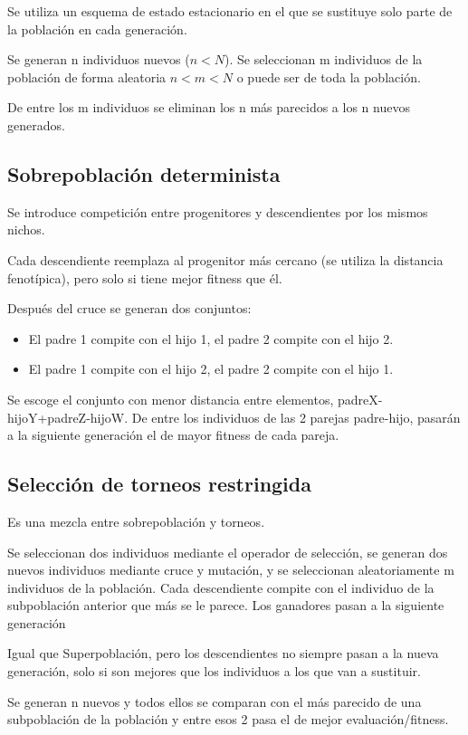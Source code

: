 \documentclass[12pt, twoside, openright]{report} %
\begin{document}
Se utiliza un esquema de estado estacionario en el que se sustituye solo parte de la población en cada generación.

Se generan n individuos nuevos ($n < N$). Se seleccionan m individuos de la población de forma aleatoria $n < m < N$ o puede ser de toda la población.

De entre los m individuos se eliminan los n más parecidos a los n nuevos generados.

\subsection{Sobrepoblación determinista}
Se introduce competición entre progenitores y descendientes por los mismos nichos.

Cada descendiente reemplaza al progenitor más cercano (se utiliza la distancia fenotípica), pero solo si tiene mejor fitness que él.

Después del cruce se generan dos conjuntos:
\begin{itemize}
	\item El padre 1 compite con el hijo 1, el padre 2 compite con el hijo 2.
	\item El padre 1 compite con el hijo 2, el padre 2 compite con el hijo	1.
\end{itemize}

Se escoge el conjunto con menor distancia entre elementos, padreX-hijoY+padreZ-hijoW. De entre los individuos de las 2 parejas padre-hijo, pasarán a la siguiente generación el de mayor fitness de cada pareja.

\subsection{Selección de torneos restringida}
Es una mezcla entre sobrepoblación y torneos.

Se seleccionan dos individuos mediante el operador de selección, se generan dos nuevos individuos mediante cruce y mutación, y se seleccionan aleatoriamente m individuos de la población. Cada descendiente compite con el individuo de la subpoblación anterior que más se le parece. Los ganadores pasan a la siguiente generación

Igual que Superpoblación, pero los descendientes no siempre pasan a la nueva generación, solo si son mejores que los individuos a los que van a sustituir.

Se generan n nuevos y todos ellos se comparan con el más parecido de una subpoblación de la población y entre esos 2 pasa el de mejor evaluación/fitness.
\end{document}
